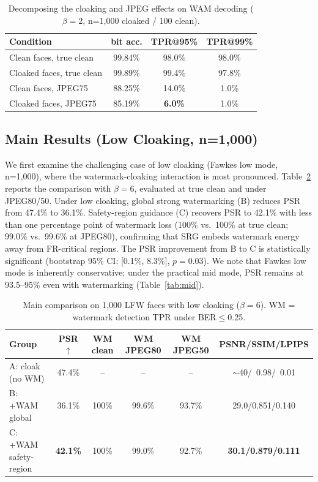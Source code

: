 \documentclass[preprint,12pt]{elsarticle}
\begin{document}
\begin{table}[t]
\caption{Decomposing the cloaking and JPEG effects on WAM decoding ($\beta{=}2$, n=1{,}000 cloaked / 100 clean).}
\label{tab:conflict}
\centering
\small
\begin{tabular}{lccc}
\toprule
Condition & bit acc. & TPR@95\% & TPR@99\% \\
\midrule
Clean faces, true clean     & 99.84\% & 98.0\% & 98.0\% \\
Cloaked faces, true clean   & 99.89\% & 99.4\% & 97.8\% \\
Clean faces, JPEG75         & 88.25\% & 14.0\% & 1.0\% \\
Cloaked faces, JPEG75       & 85.19\% & \textbf{6.0\%} & 1.0\% \\
\bottomrule
\end{tabular}
\end{table}

\subsection{Main Results (Low Cloaking, n=1,000)}
\label{sec:main}
We first examine the challenging case of low cloaking (Fawkes low mode, n=1{,}000), where the watermark-cloaking interaction is most pronounced. Table~\ref{tab:main} reports the comparison with $\beta{=}6$, evaluated at true clean and under JPEG80/50. Under low cloaking, global strong watermarking (B) reduces PSR from 47.4\% to 36.1\%. Safety-region guidance (C) recovers PSR to 42.1\% with less than one percentage point of watermark loss (100\% vs.\ 100\% at true clean; 99.0\% vs.\ 99.6\% at JPEG80), confirming that SRG embeds watermark energy away from FR-critical regions. The PSR improvement from B to C is statistically significant (bootstrap 95\% CI: [0.1\%, 8.3\%], $p=0.03$). We note that Fawkes low mode is inherently conservative; under the practical mid mode, PSR remains at 93.5--95\% even with watermarking (Table~\ref{tab:mid}).

\begin{table}[t]
\caption{Main comparison on 1{,}000 LFW faces with low cloaking ($\beta{=}6$). WM = watermark detection TPR under BER$\le$0.25.}
\label{tab:main}
\centering
\small
\begin{tabular}{lccccc}
\toprule
Group & PSR$\uparrow$ & WM clean & WM JPEG80 & WM JPEG50 & PSNR/SSIM/LPIPS \\
\midrule
A: cloak (no WM)      & 47.4\% & -- & -- & -- & $\sim$40/~0.98/~0.01 \\
B: +WAM global        & 36.1\% & 100\% & 99.6\% & 93.7\% & 29.0/0.851/0.140 \\
C: +WAM safety-region & \textbf{42.1\%} & 100\% & 99.0\% & 92.7\% & \textbf{30.1/0.879/0.111} \\
\bottomrule
\end{tabular}
\end{table}
\end{document}

